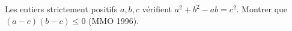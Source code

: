 Les entiers strictement positifs $a, b, c$ vérifient $a^2 + b^2 - ab = c^2$. Montrer que $(a - c)(b - c) \leq 0$ (MMO 1996).
